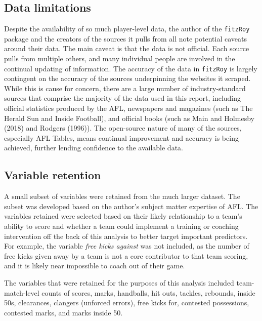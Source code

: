 \documentclass{article}
\begin{document}
\hypertarget{data-limitations}{%
\subsection{Data limitations}\label{data-limitations}}

Despite the availability of so much player-level data, the author of the \texttt{fitzRoy} package and the creators of the sources it pulls from all note potential caveats around their data. The main caveat is that the data is not official. Each source pulls from multiple others, and many individual people are involved in the continual updating of information. The accuracy of the data in \texttt{fitzRoy} is largely contingent on the accuracy of the sources underpinning the websites it scraped. While this is cause for concern, there are a large number of industry-standard sources that comprise the majority of the data used in this report, including official statistics produced by the AFL, newspapers and magazines (such as The Herald Sun and Inside Football), and official books (such as Main and Holmesby (2018) and Rodgers (1996)). The open-source nature of many of the sources, especially AFL Tables, means continual improvement and accuracy is being achieved, further lending confidence to the available data.

\hypertarget{variable-retention}{%
\subsection{Variable retention}\label{variable-retention}}

A small subset of variables were retained from the much larger dataset. The subset was developed based on the author's subject matter expertise of AFL. The variables retained were selected based on their likely relationship to a team's ability to score and whether a team could implement a training or coaching intervention off the back of this analysis to better target important predictors. For example, the variable \emph{free kicks against} was not included, as the number of free kicks given away by a team is not a core contributor to that team scoring, and it is likely near impossible to coach out of their game.

The variables that were retained for the purposes of this analysis included team-match-level counts of scores, marks, handballs, hit outs, tackles, rebounds, inside 50s, clearances, clangers (unforced errors), free kicks for, contested possessions, contested marks, and marks inside 50.
\end{document}
